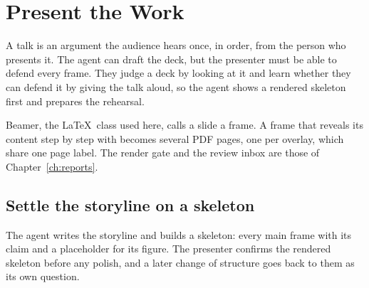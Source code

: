\chapter{Present the Work}\label{ch:talks}

A talk is an argument the audience hears once, in order, from the person who presents it.
The agent can draft the deck, but the presenter must be able to defend every frame. They
judge a deck by looking at it and learn whether they can defend it by giving the talk
aloud, so the agent shows a rendered skeleton first and prepares the rehearsal.

Beamer, the \LaTeX\ class used here, calls a slide a frame. A frame that reveals its
content step by step with \code{\\pause} becomes several PDF pages, one per overlay,
which share one page label. The render gate and the review inbox are those of
Chapter~\ref{ch:reports}.

\section{Settle the storyline on a skeleton}

\begin{headline}
  The agent writes the storyline and builds a skeleton: every main frame with its claim
  and a placeholder for its figure. The presenter confirms the rendered skeleton before
  any polish, and a later change of structure goes back to them as its own question.
\end{headline}

